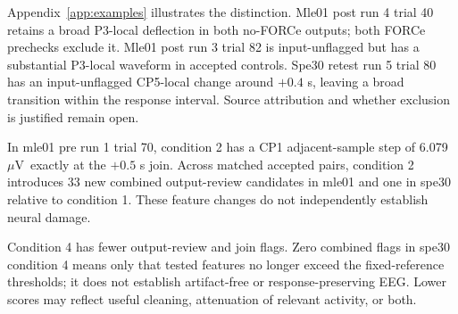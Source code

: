 \documentclass[11pt,a4paper]{article}
\newcommand{\uv}{\ensuremath{\mu\mathrm{V}}}
\begin{document}
Appendix~\ref{app:examples} illustrates the distinction. Mle01 post run 4 trial 40 retains a broad P3-local deflection in both no-FORCe outputs; both FORCe prechecks exclude it. Mle01 post run 3 trial 82 is input-unflagged but has a substantial P3-local waveform in accepted controls. Spe30 retest run 5 trial 80 has an input-unflagged CP5-local change around $+0.4$ s, leaving a broad transition within the response interval. Source attribution and whether exclusion is justified remain open.

In mle01 pre run 1 trial 70, condition 2 has a CP1 adjacent-sample step of 6.079 \uv\ exactly at the $+0.5$ s join. Across matched accepted pairs, condition 2 introduces 33 new combined output-review candidates in mle01 and one in spe30 relative to condition 1. These feature changes do not independently establish neural damage.

Condition 4 has fewer output-review and join flags. Zero combined flags in spe30 condition 4 means only that tested features no longer exceed the fixed-reference thresholds; it does not establish artifact-free or response-preserving EEG. Lower scores may reflect useful cleaning, attenuation of relevant activity, or both.
\clearpage
\end{document}
